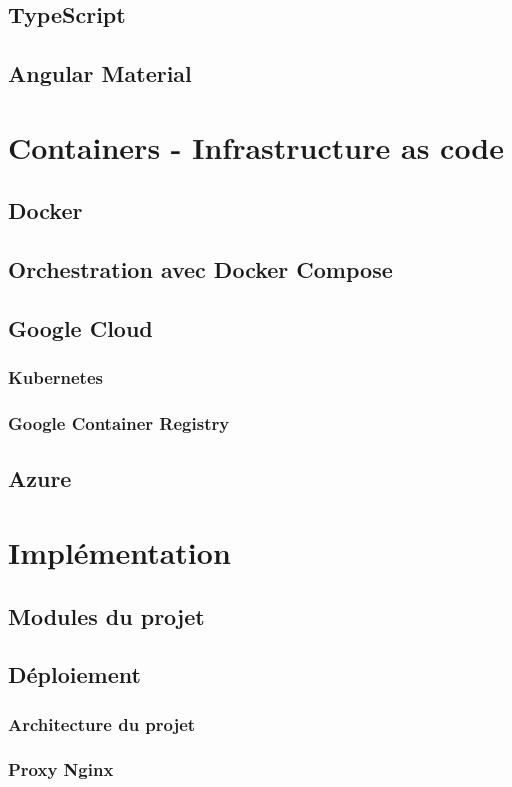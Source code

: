 \documentclass[11pt,a4paper]{report}
\begin{document}
\section{TypeScript}
\section{Angular Material}

\chapter{Containers - Infrastructure as code}
\section{Docker}
\section{Orchestration avec Docker Compose}
\section{Google Cloud}
\subsection{Kubernetes}
\subsection{Google Container Registry}
\section{Azure}

\chapter{Implémentation}
\section{Modules du projet}
\section{Déploiement}
\subsection{Architecture du projet}
\subsection{Proxy Nginx}
\end{document}
